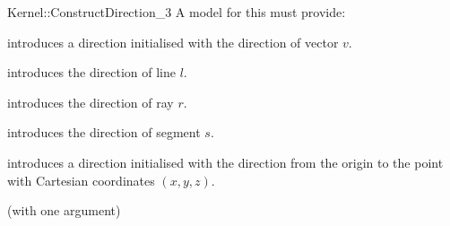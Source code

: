 \begin{ccRefFunctionObjectConcept}{Kernel::ConstructDirection_3}
A model for this must provide:


            {introduces a direction  initialised with the 
             direction of vector $v$.}

            {introduces the direction of line $l$.}

            {introduces the direction of ray $r$.}

            {introduces the direction of segment $s$.}

\ccHidden{}
            {introduces a direction  initialised with the direction 
             from the origin to the point with Cartesian coordinates $(x, y, z)$.}

\ccRefines
{} (with one argument)

\ccSeeAlso

  \\

\end{ccRefFunctionObjectConcept}
